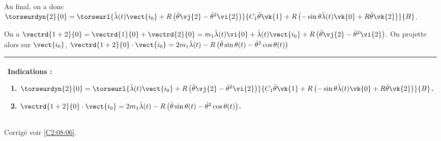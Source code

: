 Au final, on a donc $\torseurdyn{2}{0}=\torseurl{\ddot{\lambda}(t) \vect{i_0} + R \left(\ddot{\theta} \vj{2} - \dot{\theta}^2 \vi{2}\right)}{C_1  \ddot{\theta} \vk{1} + R\left( -\sin \theta \ddot{\lambda}(t) \vk{0} + R \ddot{\theta} \vk{2}\right)}{B}$.
\else
\fi

\ifprof

On a $\vectrd{1+2}{0}=\vectrd{1}{0}+\vectrd{2}{0}=m_1\ddot{\lambda}(t)\vi{0}+\ddot{\lambda}(t) \vect{i_0} + R \left(\ddot{\theta} \vj{2} - \dot{\theta}^2 \vi{2}\right)$.
On projette alors sur $\vect{i_0}$,
$\vectrd{1+2}{0}\cdot \vect{i_0}=2m_1\ddot{\lambda}(t)- R \left(\ddot{\theta} \sin\theta(t) - \dot{\theta}^2 \cos\theta(t)\right) $
\else
\fi

\ifprof
\else
\footnotesize
\begin{center}
\begin{tabular}{|p{.9\linewidth}|}
\hline
Indications :
\begin{enumerate}
\item $\torseurdyn{2}{0}=\torseurl{\ddot{\lambda}(t) \vect{i_0} + R \left(\ddot{\theta} \vj{2} - \dot{\theta}^2 \vi{2}\right)}{C_1  \ddot{\theta} \vk{1} + R\left( -\sin \theta \ddot{\lambda}(t) \vk{0} + R \ddot{\theta} \vk{2}\right)}{B}$.
\item $\vectrd{1+2}{0}\cdot \vect{i_0}=2m_1\ddot{\lambda}(t)- R \left(\ddot{\theta} \sin\theta(t) - \dot{\theta}^2 \cos\theta(t)\right) $. 
\end{enumerate} \\ \hline
\end{tabular}
\end{center}
\normalsize
\begin{flushright}
\footnotesize{Corrigé  voir \ref{C2:08:06}.}
\end{flushright}%
\fi